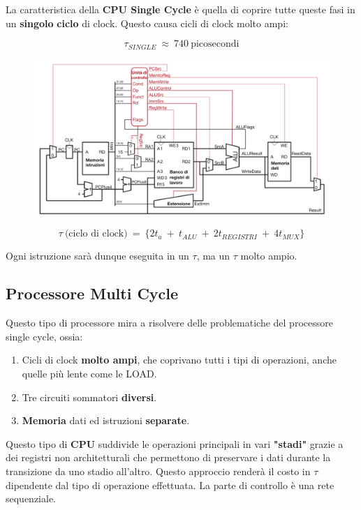\documentclass{article}
\begin{document}
La caratteristica della \textbf{CPU Single Cycle} è quella di coprire tutte queste fasi in un \textbf{singolo} \textbf{ciclo} di clock. Questo causa cicli di clock molto ampi:

\[ \tau_{SINGLE} \: \approx \: 740 \: \text{picosecondi} \]

    \begin{figure}[htbp]
        \center
        \includegraphics[scale=0.45]{img/implementazione_single_cycle.png}
    \end{figure}

\[ \tau \: \text{(ciclo di clock)} \: = \: \{ 2t_{a}\:+\:t_{ALU}\:+\:2t_{REGISTRI}\:+\:4t_{MUX} \} \]

\vspace*{15px}

Ogni istruzione sarà dunque eseguita in un $\tau$, ma un $\tau$ molto ampio.

\newpage

\subsection{Processore Multi Cycle}

Questo tipo di processore mira a risolvere delle problematiche del processore single cycle, ossia:

\begin{enumerate}
    \item Cicli di clock \textbf{molto ampi}, che coprivano tutti i tipi di operazioni, anche quelle più lente come le LOAD.
    \item Tre circuiti sommatori \textbf{diversi}.
        \item \textbf{Memoria} dati ed istruzioni \textbf{separate}.
\end{enumerate}

Questo tipo di \textbf{CPU} suddivide le operazioni principali in vari \textbf{"stadi"} grazie a dei registri non architetturali che permettono di preservare i dati durante la transizione da uno stadio all'altro. Questo approccio renderà il costo in $\tau$ dipendente dal tipo di operazione effettuata.
La parte di controllo è una rete sequenziale.
\end{document}
